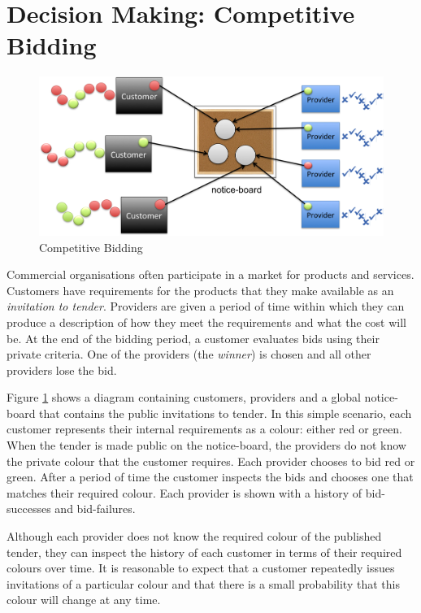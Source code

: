 \documentclass[10pt,numbers]{sigplanconf}
\begin{document}
\section{Decision Making: Competitive Bidding}

\label{sec:bidding}

\begin{figure}[t]
\includegraphics[width=\columnwidth]{service_providers}
\caption{Competitive Bidding}
\label{fig:competitive_bidding}
\end{figure}

Commercial organisations often participate in a market for products and services. Customers have requirements for the products that they make available as an {\it invitation to tender}. Providers are given a period of time within which they can produce a description of how they meet the requirements and what the cost will be. At the end of the bidding period, a customer evaluates  bids using their private criteria. One of the providers (the {\it winner}) is chosen and all other providers lose the bid.

Figure \ref{fig:competitive_bidding} shows a diagram containing customers, providers and a global notice-board that contains the public invitations to tender. In this simple scenario, each customer represents their internal requirements as a colour: either red or green. When the tender is made public on the notice-board, the providers do not know the private colour that the customer requires. Each provider chooses to bid red or green. After a period of time the customer inspects the bids and chooses one that matches their required colour. Each provider is shown with a history of bid-successes and bid-failures.

Although each provider does not know the required colour of the published tender, they can inspect the history of each customer in terms of their required colours over time. It is reasonable to expect that a customer repeatedly issues invitations of a particular colour and that there is a small probability that this colour will change at any time.
\end{document}
